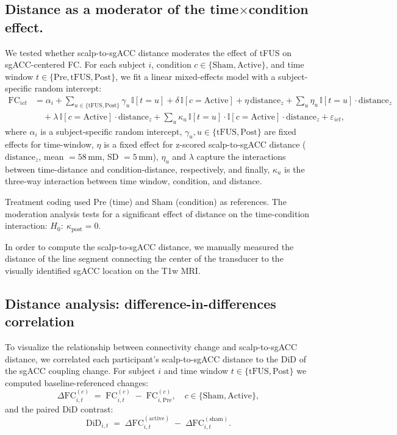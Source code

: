 \subsection*{Distance as a moderator of the time$\times$condition effect.}
\noindent
We tested whether scalp-to-sgACC distance moderates the effect of tFUS on sgACC-centered FC. For each subject $i$, condition $c\in\{\mathrm{Sham},\mathrm{Active}\}$, and time window $t\in\{\mathrm{Pre},\mathrm{tFUS},\mathrm{Post}\}$, we fit a linear mixed-effects model with a subject-specific random intercept:
\[
\begin{aligned}
\mathrm{FC}_{ict} &=
\alpha_i
+ \sum_{u\in\{\mathrm{tFUS},\mathrm{Post}\}}\gamma_u\,\mathbb{I}[t=u]
+ \delta\,\mathbb{I}[c=\mathrm{Active}]
+ \eta\,\mathrm{distance}_z 
+ \sum_{u}\eta_u\,\mathbb{I}[t=u]\cdot \mathrm{distance}_z \\
&\quad
+ \lambda\,\mathbb{I}[c=\mathrm{Active}]\cdot \mathrm{distance}_z
+ \sum_{u}\kappa_u\,\mathbb{I}[t=u]\cdot \mathbb{I}[c=\mathrm{Active}]\cdot \mathrm{distance}_z
+ \varepsilon_{ict},
\end{aligned}
\]
where $\alpha_i$ is a subject-specific random intercept, $\gamma_u, u\in\{\mathrm{tFUS},\mathrm{Post}\}$ are fixed effects for time-window, $\eta$ is a fixed effect for z-scored scalp-to-sgACC distance ($\mathrm{distance}_z$, mean $=58$\,mm, SD $=5$\,mm), $\eta_u$ and $\lambda$ capture the interactions between time-distance and condition-distance, respectively, and finally, $\kappa_u$ is the three-way interaction between time window, condition, and distance. 

Treatment coding used $\mathrm{Pre}$ (time) and $\mathrm{Sham}$ (condition) as references. The moderation analysis tests for a significant effect of distance on the time-condition interaction: $H_0\!:\ \kappa_{\mathrm{post}}=0$. 

In order to compute the scalp-to-sgACC distance, we manually measured the distance of the line segment connecting the center of the transducer to the visually identified sgACC location on the T1w MRI.

\subsection*{Distance analysis: difference-in-differences correlation}
\noindent
To visualize the relationship between connectivity change and scalp-to-sgACC distance, we correlated each participant’s scalp-to-sgACC distance to the DiD of the sgACC coupling change. For subject $i$ and time window $t \in \{\text{tFUS},\text{Post}\}$ we computed baseline-referenced changes:
\[
\Delta\mathrm{FC}^{(c)}_{i,t} \;=\; \mathrm{FC}^{(c)}_{i,t} \;-\; \mathrm{FC}^{(c)}_{i,\mathrm{Pre}},
\quad c \in \{\text{Sham}, \text{Active}\},
\]
and the paired DiD contrast:
\[
\mathrm{DiD}_{i,t} \;=\; \Delta\mathrm{FC}^{(\text{active})}_{i,t} \;-\; \Delta\mathrm{FC}^{(\text{sham})}_{i,t}.
\]

